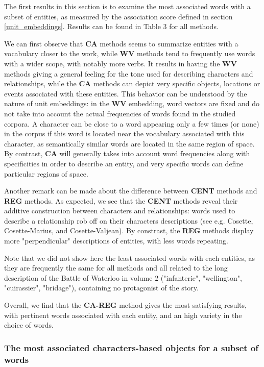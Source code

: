 \documentclass[
twocolumn,
]{ceurart}
\begin{document}
The first results in this section is to examine the most associated words with a subset of entities, as measured by the association score defined in section \ref{unit_embeddings}. Results can be found in Table 3 for all methods.

We can first observe that \textbf{CA} methods seems to summarize entities with a vocabulary closer to the work, while \textbf{WV} methods tend to frequently use words with a wider scope, with notably more verbs. It results in having the \textbf{WV} methods giving a general feeling for the tone used for describing characters and relationships, while the \textbf{CA} methods can depict very specific objects, locations or events associated with these entities. This behavior can be understood by the nature of unit embeddings: in the \textbf{WV} embedding, word vectors are fixed and do not take into account the actual frequencies of words found in the studied corpora. A character can be close to a word appearing only a few times (or none) in the corpus if this word is located near the vocabulary associated with this character, as semantically similar words are located in the same region of space. By contrast, \textbf{CA} will generally takes into account word frequencies along with specificities in order to describe an entity, and very specific words can define particular regions of space.

Another remark can be made about the difference between \textbf{CENT} methods and \textbf{REG} methods. As expected, we see that the \textbf{CENT} methods reveal their additive construction between characters and relationships: words used to describe a relationship rob off on their characters descriptions (see e.g. Cosette, Cosette-Marius, and Cosette-Valjean). By constrast, the \textbf{REG} methods display more "perpendicular" descriptions of entities, with less words repeating.   

Note that we did not show here the least associated words with each entities, as they are frequently the same for all methods and all related to the long description of the Battle of Waterloo in volume 2 ("infanterie", "wellington", "cuirassier", "bridage"), containing no protagonist of the story. 

Overall, we find that the \textbf{CA-REG} method gives the most satisfying results, with pertinent words associated with each entity, and an high variety in the choice of words. 
	
\subsubsection{The most associated characters-based objects for a subset of words}
\label{objects}
\end{document}
